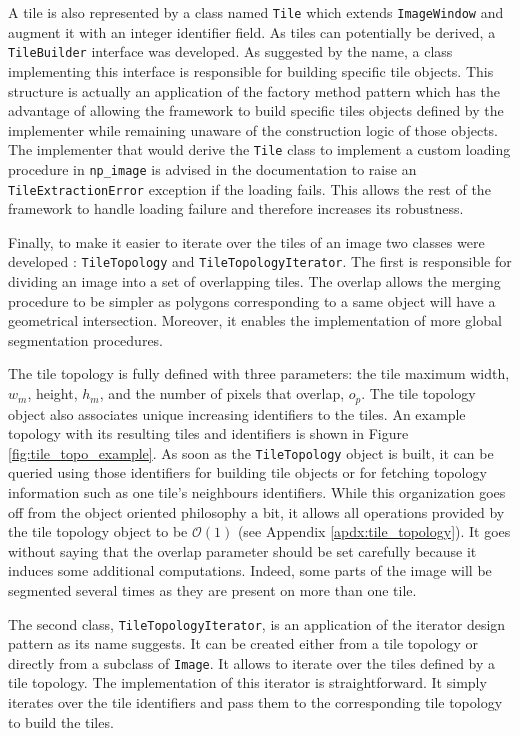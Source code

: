 A tile is also represented by a class named \texttt{Tile} which extends \texttt{ImageWindow} and augment it with an integer identifier field. As tiles can potentially be derived, a \texttt{TileBuilder} interface was developed. As suggested by the name, a class implementing this interface is responsible for building specific tile objects. This structure is actually an application of the factory method pattern which has the advantage of allowing the framework to build specific tiles objects defined by the implementer while remaining unaware of the construction logic of those objects. The implementer that would derive the \texttt{Tile} class to implement a custom loading procedure in \texttt{np\_image} is advised in the documentation to raise an \texttt{TileExtractionError} exception if the loading fails. This allows the rest of the framework to handle loading failure and therefore increases its robustness. 

Finally, to make it easier to iterate over the tiles of an image two classes were developed : \texttt{TileTopology} and \texttt{TileTopologyIterator}. The first is responsible for dividing an image into a set of overlapping tiles. The overlap allows the merging procedure to be simpler as polygons corresponding to a same object will have a geometrical intersection. Moreover, it enables the implementation of more global segmentation procedures.

The tile topology is fully defined with three parameters: the tile maximum width, $w_m$, height, $h_m$, and the number of pixels that overlap, $o_p$. The tile topology object also associates unique increasing identifiers to the tiles. An example topology with its resulting tiles and identifiers is shown in Figure \ref{fig:tile_topo_example}. As soon as the \texttt{TileTopology} object is built, it can be queried using those identifiers for building tile objects or for fetching topology information such as one tile's neighbours identifiers. While this organization goes off from the object oriented philosophy a bit, it allows all operations provided by the tile topology object to be $\mathcal{O}(1)$ (see Appendix \ref{apdx:tile_topology}). It goes without saying that the overlap parameter should be set carefully because it induces some additional computations. Indeed, some parts of the image will be segmented several times as they are present on more than one tile. 

The second class, \texttt{TileTopologyIterator}, is an application of the iterator design pattern as its name suggests. It can be created either from a tile topology or directly from a subclass of \texttt{Image}. It allows to iterate over the tiles defined by a tile topology. The implementation of this iterator is straightforward. It simply iterates over the tile identifiers and pass them to the corresponding tile topology to build the tiles. 

